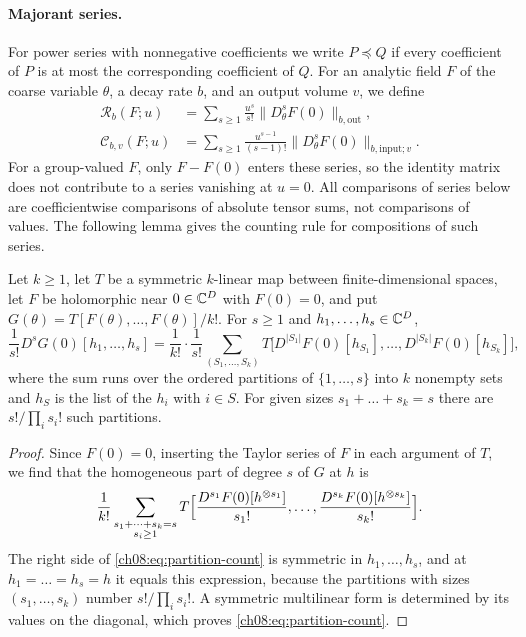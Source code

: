 \paragraph{Majorant series.}
For power series with nonnegative coefficients we write $P\preccurlyeq Q$ if every coefficient of $P$ is at most the corresponding coefficient of $Q$. For an analytic field $F$ of the coarse variable $\theta$, a decay rate $b$, and an output volume $v$, we define
\begin{equation}\label{ch08:eq:aligned-series-convention}
 \begin{aligned}
 \mathscr R_b(F;u)&=
  \sum_{s\ge1}\frac{u^s}{s!}
                     \|D_\theta^sF(0)\|_{b,\mathrm{out}},\\
 \mathscr C_{b,v}(F;u)&=
  \sum_{s\ge1}\frac{u^{s-1}}{(s-1)!}
                     \|D_\theta^sF(0)\|_{b,\mathrm{input};v}.
 \end{aligned}
\end{equation}
For a group-valued $F$, only $F-F(0)$ enters these series, so the identity matrix does not contribute to a series vanishing at $u=0$. All comparisons of series below are coefficientwise comparisons of absolute tensor sums, not comparisons of values. The following lemma gives the counting rule for compositions of such series.

\begin{lemma}\label{ch08:lem:majorant-composition}
Let $k\ge1$, let $T$ be a symmetric $k$-linear map between finite-dimensional spaces, let $F$ be holomorphic near $0\in\mathbb C^D$ with $F(0)=0$, and put $G(\theta)=T[F(\theta),\dots,F(\theta)]/k!$. For $s\ge1$ and $h_1,\dots,h_s\in\mathbb C^D$,
\begin{equation}\label{ch08:eq:partition-count}
 \frac1{s!}D^sG(0)[h_1,\dots,h_s]
 =\frac1{k!}\cdot\frac1{s!}\sum_{(S_1,\dots,S_k)}
   T\bigl[D^{|S_1|}F(0)[h_{S_1}],\dots,D^{|S_k|}F(0)[h_{S_k}]\bigr],
\end{equation}
where the sum runs over the ordered partitions of $\{1,\dots,s\}$ into $k$ nonempty sets and $h_S$ is the list of the $h_i$ with $i\in S$. For given sizes $s_1+\dots+s_k=s$ there are $s!/\prod_is_i!$ such partitions.
\end{lemma}

\begin{proof}
Since $F(0)=0$, inserting the Taylor series of $F$ in each argument of $T$, we find that the homogeneous part of degree $s$ of $G$ at $h$ is
\[
 \frac1{k!}\sum_{\substack{s_1+\dots+s_k=s\\ s_i\ge1}}
 T\Bigl[\frac{D^{s_1}F(0)[h^{\otimes s_1}]}{s_1!},\dots,
        \frac{D^{s_k}F(0)[h^{\otimes s_k}]}{s_k!}\Bigr].
\]
The right side of \eqref{ch08:eq:partition-count} is symmetric in $h_1,\dots,h_s$, and at $h_1=\dots=h_s=h$ it equals this expression, because the partitions with sizes $(s_1,\dots,s_k)$ number $s!/\prod_is_i!$. A symmetric multilinear form is determined by its values on the diagonal, which proves \eqref{ch08:eq:partition-count}.
\end{proof}

